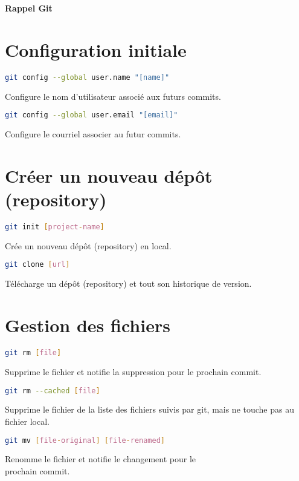 \documentclass[10pt,landscape]{article}
\begin{document}
\raggedright
\footnotesize
\begin{multicols}{3}


\setlength{\premulticols}{1pt}
\setlength{\postmulticols}{1pt}
\setlength{\multicolsep}{1pt}
\setlength{\columnsep}{2pt}

\begin{center}
     \Large{\textbf{Rappel Git}} \\
\end{center}

\section{Configuration initiale}
\begin{lstlisting}[language=bash]
git config --global user.name "[name]"
\end{lstlisting}
Configure le nom d’utilisateur associé aux futurs commits.
\begin{lstlisting}[language=bash]
git config --global user.email "[email]"
\end{lstlisting}
Configure le courriel associer au futur commits.


\section{Créer un nouveau dépôt (repository)}
\begin{lstlisting}[language=bash]
git init [project-name]
\end{lstlisting}
Crée un nouveau dépôt (repository) en local.\\
\begin{lstlisting}[language=bash]
git clone [url]
\end{lstlisting}
Télécharge un dépôt (repository) et tout son historique de version.


\section{Gestion des fichiers}
\begin{lstlisting}[language=bash]
git rm [file]
\end{lstlisting}
Supprime le fichier et notifie la suppression pour le prochain commit.\\
\begin{lstlisting}[language=bash]
git rm --cached [file]
\end{lstlisting}
Supprime le fichier de la liste des fichiers suivis par git, mais ne touche pas au fichier local.\\
\begin{lstlisting}[language=bash]
git mv [file-original] [file-renamed]
\end{lstlisting}
Renomme le fichier et notifie le changement pour le\\
prochain commit.


\end{multicols}
\end{document}
